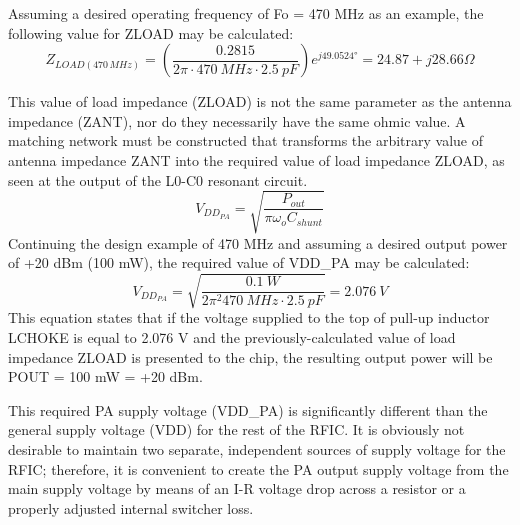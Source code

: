         Assuming a desired operating frequency of Fo = 470 MHz as an example, the following value 
        for ZLOAD may be calculated:
        \begin{equation}\label{EXP001:eq_spirit04}
          Z_{LOAD(470\,MHz)} = 
            \left(\frac{0.2815}{2\pi\cdot\SI{470}{MHz}\cdot\SI{2.5}{pF}}\right)e^{j49.0524°} =
            24.87 + j28.66\Omega
        \end{equation} 
        
        This value of load impedance (ZLOAD) is not the same parameter as the antenna impedance 
        (ZANT), nor do they necessarily have the same ohmic value. A matching network must be 
        constructed that transforms the arbitrary value of antenna impedance ZANT into the required 
        value of load impedance ZLOAD, as seen at the output of the L0-C0 resonant circuit.
        \begin{equation}\label{EXP001:eq_spirit05}
          V_{DD_{PA}} = \sqrt{\frac{P_{out}}{\pi\omega_oC_{shunt}}}
        \end{equation}
        Continuing the design example of 470 MHz and assuming a desired output power of +20 dBm 
        (100 mW), the required value of VDD\_PA may be calculated:
        \begin{equation}\label{EXP001:eq_spirit06}
          V_{DD_{PA}} =\sqrt{\frac{\SI{0.1}{W}}{2\pi^2\SI{470}{MHz}\cdot\SI{2.5}{pF}}} = \SI{2.076}{V}
        \end{equation}
        This equation states that if the voltage supplied to the top of pull-up inductor LCHOKE is 
        equal to 2.076 V and the previously-calculated value of load impedance ZLOAD is presented 
        to the chip, the resulting output power will be POUT = 100 mW = +20 dBm.
        
        This required PA supply voltage (VDD\_PA) is significantly different than the general 
        supply voltage (VDD) for the rest of the RFIC. It is obviously not desirable to maintain 
        two separate, independent sources of supply voltage for the RFIC; therefore, it is 
        convenient to create the PA output supply voltage from the main supply voltage by means of 
        an I-R voltage drop across a resistor or a properly adjusted internal switcher loss.
        
